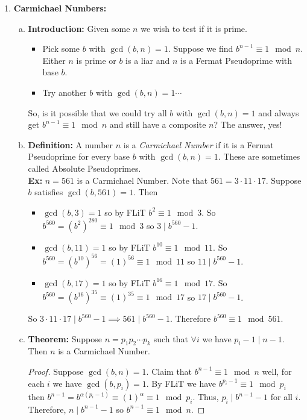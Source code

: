 \documentclass[class=article, crop=false]{standalone}
\begin{document}
\begin{enumerate}[1.]
	\item \textbf{Carmichael Numbers:}
		\begin{enumerate}[(a)]
			\item \textbf{Introduction:}
				Given some $n$ we wish to test if it is prime.
				\begin{itemize}
					\item Pick some $b$ with $\gcd(b,n)=1$.
						Suppose we find $b^{n-1} \equiv 1\mod n$.
						Either $n$ is prime or $b$ is a liar and $n$ is a Fermat
						Pseudoprime with base $b$.
					
					\item Try another $b$ with $\gcd(b,n)=1\cdots$
				\end{itemize}
				So, is it possible that we could try all $b$ with $\gcd(b,n)=1$
				and always get $b^{n-1}\equiv 1\mod n$ and still have a composite $n$?
				The answer, yes!
			
			\item \textbf{Definition:}
				A number $n$ is a \emph{Carmichael Number} if it is a Fermat Pseudoprime for
				every base $b$ with $\gcd(b,n)=1$. These are sometimes called Absolute Pseudoprimes.\\
				\textbf{Ex:} $n=561$ is a Carmichael Number. Note that $561=3\cdot 11\cdot 17$.
				Suppose $b$ satisfies $\gcd(b,561)=1$. Then
				\begin{itemize}
					\item $\gcd(b,3)=1$ so by FLiT $b^2 \equiv 1\mod 3$. So $b^{560}=(b^2)^{280}\equiv 1\mod 3$
						so $3\mid b^{560}-1$.
					\item $\gcd(b,11)=1$ so by FLiT $b^{10}\equiv 1\mod 11$. So
						$b^{560}=(b^{10})^{56}=(1)^{56}\equiv 1\mod 11$ so $11\mid b^{560}-1$.
					\item $\gcd(b,17)=1$ so by FLiT $b^{16}\equiv 1\mod 17$. So
						$b^{560}=(b^{16})^{35}\equiv(1)^{35}\equiv 1\mod 17$ so $17\mid b^{560}-1$.
				\end{itemize}
				So $3\cdot 11\cdot 17\mid b^{560}-1 \implies 561\mid b^{560}-1$. Therefore $b^{560}\equiv 1\mod 561$.

			\item \textbf{Theorem:}
				Suppose $n=p_1 p_2\cdots p_k$ such that $\forall i$ we have $p_i -1\mid n-1$.
				Then $n$ is a Carmichael Number.
				\begin{proof}
					Suppose $\gcd(b,n)=1$. Claim that $b^{n-1}\equiv 1\mod n$ well, for each $i$ we have
					$\gcd(b, p_i)=1$. By FLiT we have $b^{p_i -1} \equiv 1\mod p_i$ then
					$b^{n-1}=b^{\alpha(p_i-1)}\equiv (1)^{\alpha}\equiv 1\mod p_i$. Thus,
					$p_i\mid b^{n-1}-1$ for all $i$. Therefore, $n\mid b^{n-1}-1$ so 
					$b^{n-1}\equiv 1\mod n$.
				\end{proof}
				\noindent
		\end{enumerate}
\end{enumerate}

\end{document}
